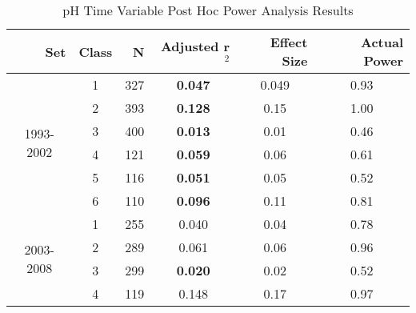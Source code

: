 \begin{table}[htbp]
  \centering
  \caption{pH Time Variable Post Hoc Power Analysis Results}
    \begin{tabular}{rrrrrr}
    \toprule
    Set   & Class & N     & Adjusted r$^2$ & Effect Size & Actual Power \\
    \midrule
    \multicolumn{1}{c}{\multirow{6}[1]{*}{\begin{sideways}1993-2002\end{sideways}}} & \multicolumn{1}{c}{1} & \multicolumn{1}{c}{327} & \multicolumn{1}{c}{\textbf{0.047 }} & \multicolumn{1}{c}{0.049 } & \multicolumn{1}{c}{0.93 } \\
    \multicolumn{1}{c}{} & \multicolumn{1}{c}{2} & \multicolumn{1}{c}{393} & \multicolumn{1}{c}{\textbf{0.128 }} & \multicolumn{1}{c}{0.15 } & \multicolumn{1}{c}{1.00 } \\
    \multicolumn{1}{c}{} & \multicolumn{1}{c}{3} & \multicolumn{1}{c}{400} & \multicolumn{1}{c}{\textbf{0.013 }} & \multicolumn{1}{c}{0.01 } & \multicolumn{1}{c}{0.46 } \\
    \multicolumn{1}{c}{} & \multicolumn{1}{c}{4} & \multicolumn{1}{c}{121} & \multicolumn{1}{c}{\textbf{0.059 }} & \multicolumn{1}{c}{0.06 } & \multicolumn{1}{c}{0.61 } \\
    \multicolumn{1}{c}{} & \multicolumn{1}{c}{5} & \multicolumn{1}{c}{116} & \multicolumn{1}{c}{\textbf{0.051 }} & \multicolumn{1}{c}{0.05 } & \multicolumn{1}{c}{0.52 } \\
    \multicolumn{1}{c}{} & \multicolumn{1}{c}{6} & \multicolumn{1}{c}{110} & \multicolumn{1}{c}{\textbf{0.096 }} & \multicolumn{1}{c}{0.11 } & \multicolumn{1}{c}{0.81 } \\\midrule
    \multicolumn{1}{c}{\multirow{6}[2]{*}{\begin{sideways}2003-2008\end{sideways}}} & \multicolumn{1}{c}{1} & \multicolumn{1}{c}{255} & \multicolumn{1}{c}{0.040 } & \multicolumn{1}{c}{0.04 } & \multicolumn{1}{c}{0.78 } \\
    \multicolumn{1}{c}{} & \multicolumn{1}{c}{2} & \multicolumn{1}{c}{289} & \multicolumn{1}{c}{0.061 } & \multicolumn{1}{c}{0.06 } & \multicolumn{1}{c}{0.96 } \\
    \multicolumn{1}{c}{} & \multicolumn{1}{c}{3} & \multicolumn{1}{c}{299} & \multicolumn{1}{c}{\textbf{0.020 }} & \multicolumn{1}{c}{0.02 } & \multicolumn{1}{c}{0.52 } \\
    \multicolumn{1}{c}{} & \multicolumn{1}{c}{4} & \multicolumn{1}{c}{119} & \multicolumn{1}{c}{0.148 } & \multicolumn{1}{c}{0.17 } & \multicolumn{1}{c}{0.97 } \\

\end{tabular}
\end{table}
